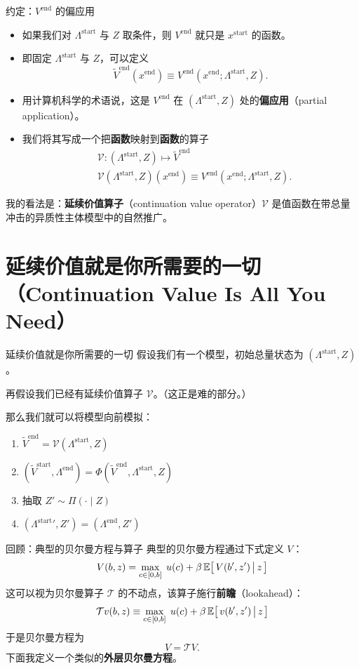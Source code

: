 \documentclass[10pt,aspectratio=169]{beamer}
\newcommand{\Vend}{V^{\mathrm{end}}}
\newcommand{\Vstarttil}{\widetilde{V}^{\mathrm{start}}}
\newcommand{\Vendtil}{\widetilde{V}^{\mathrm{end}}}
\newcommand{\Lstart}{\Lambda^{\mathrm{start}}}
\newcommand{\Lend}{\Lambda^{\mathrm{end}}}
\newcommand{\xstart}{x^{\mathrm{start}}}
\newcommand{\xend}{x^{\mathrm{end}}}
\newcommand{\CV}{\mathcal{V}}
\begin{document}
\begin{frame}{约定：$\Vend$ 的偏应用}
  \begin{itemize}
    \item 如果我们对 $\Lstart$ 与 $Z$ 取条件，则 $\Vend$ 就只是 $\xstart$ 的函数。
    \item 即固定 $\Lstart$ 与 $Z$，可以定义
    \[
      \Vendtil(\xend) \equiv \Vend(\xend; \Lstart, Z).
    \]
    \item 用计算机科学的术语说，这是 $\Vend$ 在 $(\Lstart, Z)$ 处的\textbf{偏应用}（partial application）。
    \item 我们将其写成一个把\textbf{函数}映射到\textbf{函数}的算子
    \begin{align*}
      &\CV: (\Lstart, Z) \mapsto \Vendtil \\
      &\CV(\Lstart, Z)(\xend) \equiv \Vend(\xend; \Lstart, Z).
    \end{align*}
  \end{itemize}
  我的看法是：\textbf{延续价值算子}（continuation value operator）$\CV$ 是值函数在带总量冲击的异质性主体模型中的自然推广。
\end{frame}

\section[CVIAYN]{延续价值就是你所需要的一切（Continuation Value Is All You Need）}

\begin{frame}{延续价值就是你所需要的一切}
  假设我们有一个模型，初始总量状态为 $(\Lstart, Z)$。

  再假设我们已经有延续价值算子 $\CV$。（这正是难的部分。）

  那么我们就可以将模型向前模拟：
  \begin{enumerate}
    \item $\Vendtil = \CV(\Lstart, Z)$
    \item $(\Vstarttil, \Lend) = \Phi(\Vendtil, \Lstart, Z)$
    \item 抽取 $Z' \sim \Pi(\cdot \mid Z)$
    \item $(\Lstart{}', Z') = (\Lend, Z')$
  \end{enumerate}
\end{frame}

\begin{frame}{回顾：典型的贝尔曼方程与算子}
  典型的贝尔曼方程通过下式定义 $V$：
  \[
    V(b, z) = \max_{c \in [0, b]} \; u(c) + \beta \, \mathbb{E}\!\left[\, V(b', z') \,\big|\, z \,\right]
  \]
  这可以视为贝尔曼算子 $\mathcal{T}$ 的不动点，该算子施行\textbf{前瞻}（lookahead）：
  \[
    \mathcal{T}v(b, z) \equiv \max_{c \in [0, b]} \; u(c) + \beta \, \mathbb{E}\!\left[\, v(b', z') \,\big|\, z \,\right]
  \]
  于是贝尔曼方程为
  \[
    V = \mathcal{T}V.
  \]
  下面我定义一个类似的\textbf{外层贝尔曼方程}。
\end{frame}
\end{document}
